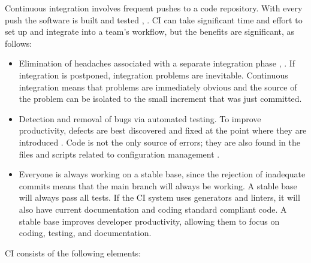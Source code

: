 \documentclass[final, 3p, times, authoryear]{elsarticle}
\begin{document}
Continuous integration involves frequent pushes to a code repository.  With
every push the software is built and tested \citep[p.\ 13]
{HumbleAndFarley2010}, \citep{ShahinEtAl2017, Fowler2006}.  CI can take
significant time and effort to set up and integrate into a team's workflow, but
the benefits are significant, as follows:

\begin{itemize}
	\item Elimination of headaches associated with a separate integration phase
	\citep{Fowler2006}, \citep[p.\ 20]{HumbleAndFarley2010}. If integration is
	postponed, integration problems are inevitable.  Continuous integration
	means that problems are immediately obvious and the source of the problem
	can be isolated to the small increment that was just committed.
	\item Detection and removal of bugs \citep{Fowler2006} via
	automated testing.  To improve productivity, defects are best discovered and
	fixed at the point where they are introduced \citep[p.\
	23]{HumbleAndFarley2010}.  Code is not the only source of errors; they are
	also found in the files and scripts related to configuration management
	\citep[p.\ 18]{HumbleAndFarley2010}.
	\item Everyone is always working on a stable base, since the rejection of
	inadequate commits means that the main branch will always be working.  A
	stable base will always pass all tests.  If the CI system uses generators
	and linters, it will also have current documentation and coding standard
	compliant code.  A stable base improves developer productivity, allowing
	them to focus on coding, testing, and documentation.
\end{itemize}

CI consists of the following elements:
\end{document}
